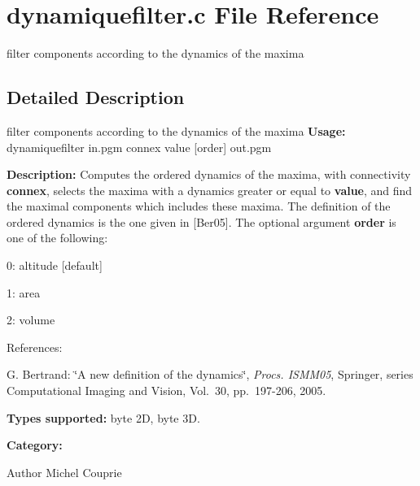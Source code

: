 \section{dynamiquefilter.c File Reference}
\label{dynamiquefilter_8c}


filter components according to the dynamics of the maxima  




\subsection{Detailed Description}
filter components according to the dynamics of the maxima {\bfseries Usage:} dynamiquefilter in.pgm connex value [order] out.pgm

{\bfseries Description:} Computes the ordered dynamics of the maxima, with connectivity {\bfseries connex}, selects the maxima with a dynamics greater or equal to {\bfseries value}, and find the maximal components which includes these maxima. The definition of the ordered dynamics is the one given in [Ber05]. The optional argument {\bfseries order} is one of the following: \begin{DoxyItemize}
\item 0: altitude [default] \item 1: area \item 2: volume\end{DoxyItemize}
References:\par
 [Ber05] G. Bertrand: \char`\"{}A new definition of the dynamics\char`\"{}, {\itshape Procs. ISMM05\/}, Springer, series Computational Imaging and Vision, Vol.~30, pp.~197-\/206, 2005.\par


{\bfseries Types supported:} byte 2D, byte 3D.

{\bfseries Category:}

\begin{DoxyAuthor}{Author}
Michel Couprie 
\end{DoxyAuthor}
